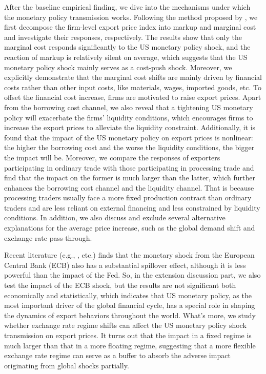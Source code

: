 After the baseline empirical finding, we dive into the mechanisms under which the monetary policy transmission works. Following the method proposed by \cite{deloecker2012markups}, we first decompose the firm-level export price index into markup and marginal cost and investigate their responses, respectively. The results show that only the marginal cost responds significantly to the US monetary policy shock, and the reaction of markup is relatively silent on average, which suggests that the US monetary policy shock mainly serves as a cost-push shock. Moreover, we explicitly demonstrate that the marginal cost shifts are mainly driven by financial costs rather than other input costs, like materials, wages, imported goods, etc. To offset the financial cost increase, firms are motivated to raise export prices. Apart from the borrowing cost channel, we also reveal that a tightening US monetary policy will exacerbate the firms' liquidity conditions, which encourages firms to increase the export prices to alleviate the liquidity constraint. Additionally, it is found that the impact of the US monetary policy on export prices is nonlinear: the higher the borrowing cost and the worse the liquidity conditions, the bigger the impact will be. Moreover, we compare the responses of exporters participating in ordinary trade with those participating in processing trade and find that the impact on the former is much larger than the latter, which further enhances the borrowing cost channel and the liquidity channel. That is because processing traders usually face a more fixed production contract than ordinary traders and are less reliant on external financing and less constrained by liquidity conditions. In addition, we also discuss and exclude several alternative explanations for the average price increase, such as the global demand shift and exchange rate pass-through.

Recent literature (e.g., \cite{miranda2022tale}, etc.) finds that the monetary shock from the European Central Bank (ECB) also has a substantial spillover effect, although it is less powerful than the impact of the Fed. So, in the extension discussion part, we also test the impact of the ECB shock, but the results are not significant both economically and statistically, which indicates that US monetary policy, as the most important driver of the global financial cycle, has a special role in shaping the dynamics of export behaviors throughout the world. What's more, we study whether exchange rate regime shifts can affect the US monetary policy shock transmission on export prices. It turns out that the impact in a fixed regime is much larger than that in a more floating regime, suggesting that a more flexible exchange rate regime can serve as a buffer to absorb the adverse impact originating from global shocks partially. 

